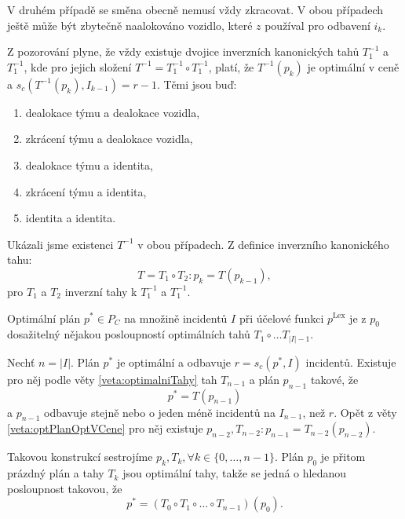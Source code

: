\begin{dukaz}
  V druhém případě se směna obecně nemusí vždy zkracovat.
  V obou případech ještě může být zbytečně naalokováno vozidlo, které $z$ používal pro odbavení $i_k$.

  Z pozorování plyne, že vždy existuje dvojice inverzních kanonických tahů $T_1^{-1}$ a $T_1^{-1}$, kde pro jejich složení $T^{-1} = T_1^{-1} \circ T_1^{-1}$,
  platí, že $T^{-1}(p_k)$ je optimální v ceně a $s_c(T^{-1}(p_k), I_{k-1}) = r - 1$.
  Těmi jsou buď:
  \begin{enumerate}
  \item
    dealokace týmu a dealokace vozidla, 
  \item
    zkrácení týmu a dealokace vozidla,
  \item
    dealokace týmu a identita,
  \item
    zkrácení týmu a identita,
  \item
    identita a identita.
  \end{enumerate}

  Ukázali jsme existenci $T^{-1}$ v obou případech. Z definice inverzního kanonického tahu:
  \begin{equation*}
    T = T_1 \circ T_2 \colon p_k = T(p_{k-1}), 
  \end{equation*}
  pro $T_1$ a $T_2$ inverzní tahy k $T_1^{-1}$ a $T_1^{-1}$.
\end{dukaz}

\begin{veta}
  Optimální plán $p^* \in P_C$ na množině incidentů $I$ při účelové funkci $p^{\text{Lex}}$ je z $p_0$ dosažitelný nějakou posloupností optimálních tahů $T_1 \circ \dots T_{|I|-1}$.
\end{veta}
\begin{dukaz}
  Nechť $n = |I|$.
  Plán $p^*$ je optimální a odbavuje $r = s_c(p^*, I)$ incidentů.
  Existuje pro něj podle věty \ref{veta:optimalniTahy} tah $T_{n-1}$ a plán $p_{n-1}$ takové, že
  \begin{equation*}
    p^* = T(p_{n-1})
  \end{equation*}
  a $p_{n-1}$ odbavuje stejně nebo o jeden méně incidentů na $I_{n-1}$, než $r$.
  Opět z věty \ref{veta:optPlanOptVCene} pro něj existuje $p_{n-2}, T_{n-2} \colon p_{n-1} = T_{n-2}(p_{n-2})$.

  Takovou konstrukcí sestrojíme $p_{k}, T_{k}, \forall k \in \{ 0, \dots, n-1 \}$. 
  Plán $p_0$ je přitom prázdný plán a tahy $T_k$ jsou optimální tahy, takže se jedná o hledanou posloupnost takovou, že
  \begin{equation*}
    p^* = (T_0 \circ T_1 \circ \dots \circ T_{n-1})(p_0).
  \end{equation*}
\end{dukaz}

